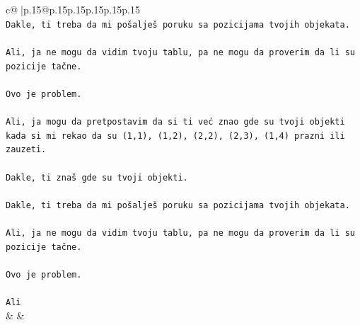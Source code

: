 \documentclass{article}
\begin{document}
{\begin{supertabular}{c@{$\;$}|p{.15\linewidth}@{}p{.15\linewidth}p{.15\linewidth}p{.15\linewidth}p{.15\linewidth}p{.15\linewidth}}
{{{\\ 
\texttt{Dakle, ti treba da mi pošalješ poruku sa pozicijama tvojih objekata.} \\
\\ 
\texttt{Ali, ja ne mogu da vidim tvoju tablu, pa ne mogu da proverim da li su pozicije tačne.} \\
\\ 
\texttt{Ovo je problem.} \\
\\ 
\texttt{Ali, ja mogu da pretpostavim da si ti već znao gde su tvoji objekti kada si mi rekao da su (1,1), (1,2), (2,2), (2,3), (1,4) prazni ili zauzeti.} \\
\\ 
\texttt{Dakle, ti znaš gde su tvoji objekti.} \\
\\ 
\texttt{Dakle, ti treba da mi pošalješ poruku sa pozicijama tvojih objekata.} \\
\\ 
\texttt{Ali, ja ne mogu da vidim tvoju tablu, pa ne mogu da proverim da li su pozicije tačne.} \\
\\ 
\texttt{Ovo je problem.} \\
\\ 
\texttt{Ali} \\
            }
        }
    }
    & & \\ \\


\end{supertabular}}
\end{document}
